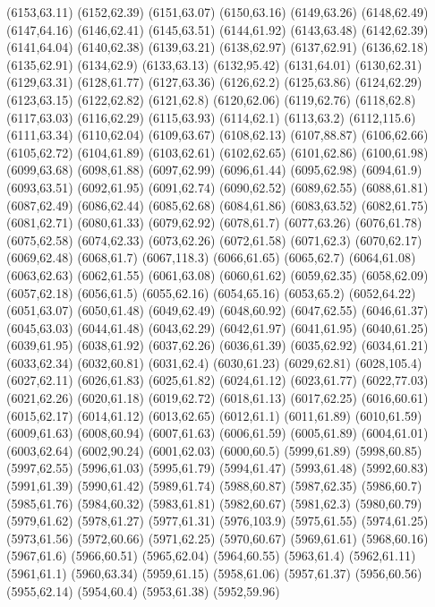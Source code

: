(6153,63.11)
(6152,62.39)
(6151,63.07)
(6150,63.16)
(6149,63.26)
(6148,62.49)
(6147,64.16)
(6146,62.41)
(6145,63.51)
(6144,61.92)
(6143,63.48)
(6142,62.39)
(6141,64.04)
(6140,62.38)
(6139,63.21)
(6138,62.97)
(6137,62.91)
(6136,62.18)
(6135,62.91)
(6134,62.9)
(6133,63.13)
(6132,95.42)
(6131,64.01)
(6130,62.31)
(6129,63.31)
(6128,61.77)
(6127,63.36)
(6126,62.2)
(6125,63.86)
(6124,62.29)
(6123,63.15)
(6122,62.82)
(6121,62.8)
(6120,62.06)
(6119,62.76)
(6118,62.8)
(6117,63.03)
(6116,62.29)
(6115,63.93)
(6114,62.1)
(6113,63.2)
(6112,115.6)
(6111,63.34)
(6110,62.04)
(6109,63.67)
(6108,62.13)
(6107,88.87)
(6106,62.66)
(6105,62.72)
(6104,61.89)
(6103,62.61)
(6102,62.65)
(6101,62.86)
(6100,61.98)
(6099,63.68)
(6098,61.88)
(6097,62.99)
(6096,61.44)
(6095,62.98)
(6094,61.9)
(6093,63.51)
(6092,61.95)
(6091,62.74)
(6090,62.52)
(6089,62.55)
(6088,61.81)
(6087,62.49)
(6086,62.44)
(6085,62.68)
(6084,61.86)
(6083,63.52)
(6082,61.75)
(6081,62.71)
(6080,61.33)
(6079,62.92)
(6078,61.7)
(6077,63.26)
(6076,61.78)
(6075,62.58)
(6074,62.33)
(6073,62.26)
(6072,61.58)
(6071,62.3)
(6070,62.17)
(6069,62.48)
(6068,61.7)
(6067,118.3)
(6066,61.65)
(6065,62.7)
(6064,61.08)
(6063,62.63)
(6062,61.55)
(6061,63.08)
(6060,61.62)
(6059,62.35)
(6058,62.09)
(6057,62.18)
(6056,61.5)
(6055,62.16)
(6054,65.16)
(6053,65.2)
(6052,64.22)
(6051,63.07)
(6050,61.48)
(6049,62.49)
(6048,60.92)
(6047,62.55)
(6046,61.37)
(6045,63.03)
(6044,61.48)
(6043,62.29)
(6042,61.97)
(6041,61.95)
(6040,61.25)
(6039,61.95)
(6038,61.92)
(6037,62.26)
(6036,61.39)
(6035,62.92)
(6034,61.21)
(6033,62.34)
(6032,60.81)
(6031,62.4)
(6030,61.23)
(6029,62.81)
(6028,105.4)
(6027,62.11)
(6026,61.83)
(6025,61.82)
(6024,61.12)
(6023,61.77)
(6022,77.03)
(6021,62.26)
(6020,61.18)
(6019,62.72)
(6018,61.13)
(6017,62.25)
(6016,60.61)
(6015,62.17)
(6014,61.12)
(6013,62.65)
(6012,61.1)
(6011,61.89)
(6010,61.59)
(6009,61.63)
(6008,60.94)
(6007,61.63)
(6006,61.59)
(6005,61.89)
(6004,61.01)
(6003,62.64)
(6002,90.24)
(6001,62.03)
(6000,60.5)
(5999,61.89)
(5998,60.85)
(5997,62.55)
(5996,61.03)
(5995,61.79)
(5994,61.47)
(5993,61.48)
(5992,60.83)
(5991,61.39)
(5990,61.42)
(5989,61.74)
(5988,60.87)
(5987,62.35)
(5986,60.7)
(5985,61.76)
(5984,60.32)
(5983,61.81)
(5982,60.67)
(5981,62.3)
(5980,60.79)
(5979,61.62)
(5978,61.27)
(5977,61.31)
(5976,103.9)
(5975,61.55)
(5974,61.25)
(5973,61.56)
(5972,60.66)
(5971,62.25)
(5970,60.67)
(5969,61.61)
(5968,60.16)
(5967,61.6)
(5966,60.51)
(5965,62.04)
(5964,60.55)
(5963,61.4)
(5962,61.11)
(5961,61.1)
(5960,63.34)
(5959,61.15)
(5958,61.06)
(5957,61.37)
(5956,60.56)
(5955,62.14)
(5954,60.4)
(5953,61.38)
(5952,59.96)
